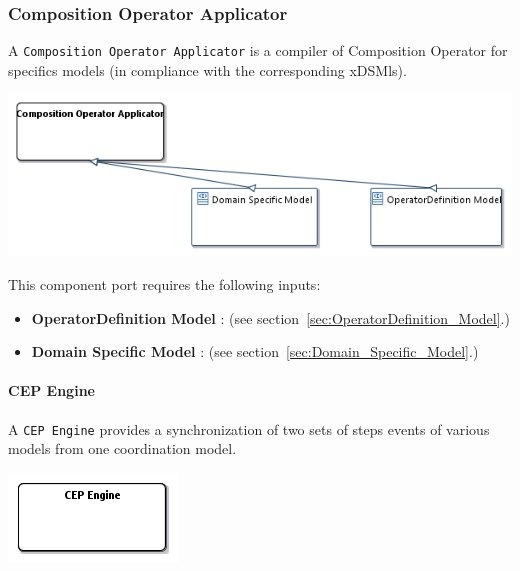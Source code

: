 \documentclass{gemoc} %
\begin{document}
\subsubsection{Composition Operator Applicator}
\label{sec:Composition_Operator_Applicator}
A \texttt{Composition Operator Applicator} is a compiler of Composition Operator for specifics models (in compliance with the corresponding xDSMls).
\begin{center}
\includegraphics*[trim=0.0cm 0.0cm 0cm 0.0cm, clip=true]{../images/generated/Generated_Composition_Operator_Applicator.png}
\end{center}

This component port requires the following inputs:
\begin{itemize}
  \item \textbf{OperatorDefinition Model} :
(see section~\ref{sec:OperatorDefinition_Model}.)
  \item \textbf{Domain Specific Model} :
(see section~\ref{sec:Domain_Specific_Model}.)
\end{itemize}


\paragraph{CEP Engine}
\label{sec:CEP_Engine}
A \texttt{CEP Engine} provides a synchronization of two sets of steps events of various models from one coordination model.
\begin{center}
\includegraphics*[trim=0.0cm 0.0cm 0cm 0.0cm, clip=true]{../images/generated/Generated_CEP_Engine.png}
\end{center}
\end{document}
